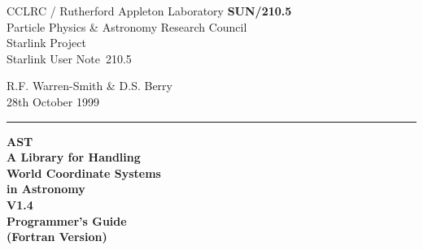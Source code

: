 \documentclass[twoside,11pt]{article}
\newcommand{\stardoccategory}  {Starlink User Note}
\newcommand{\stardocinitials}  {SUN}
\newcommand{\stardocnumber}    {210.5}
\newcommand{\stardocauthors}   {R.F. Warren-Smith \& D.S. Berry}
\newcommand{\stardocdate}      {28th October 1999}
\newcommand{\stardoctitle}     {AST\\
                                A Library for Handling\\
                                World Coordinate Systems\\
                                in Astronomy}
\newcommand{\stardocversion}   {V1.4}
\newcommand{\stardocmanual}    {Programmer's Guide\\(Fortran Version)}
\newcommand{\stardocname}{\stardocinitials /\stardocnumber}
\newenvironment{latexonly}{}{}
\begin{document}
\thispagestyle{empty}

\begin{latexonly}
   CCLRC / {\sc Rutherford Appleton Laboratory} \hfill {\bf \stardocname}\\
   {\large Particle Physics \& Astronomy Research Council}\\
   {\large Starlink Project\\}
   {\large \stardoccategory\ \stardocnumber}
   \begin{flushright}
   \stardocauthors\\
   \stardocdate
   \end{flushright}
   \vspace{-4mm}
   \rule{\textwidth}{0.5mm}
   \vspace{-7mm}
   \begin{center}
   {\Huge\bf  \stardoctitle \\ [2.0ex]}
   {\LARGE\bf \stardocversion \\ [1.0ex]}
   {\Huge\bf  \stardocmanual}
   \end{center}


\end{latexonly}
\end{document}
